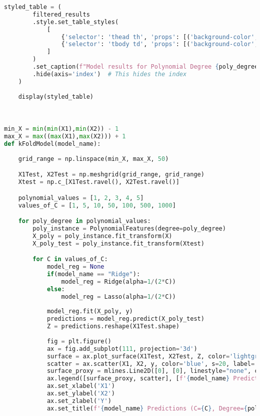\documentclass[a4paper,10pt]{article}
\begin{document}
\begin{enumerate}
\begin{lstlisting}[language=Python, caption={}]
    styled_table = (
        filtered_results
        .style.set_table_styles(
            [
                {'selector': 'thead th', 'props': [('background-color', 'white'), ('color', 'black'), ('font-size', '12pt')]},
                {'selector': 'tbody td', 'props': [('background-color', 'white'), ('color', 'black'), ('border', '1px solid black')]},
            ]
        )
        .set_caption(f"Model results for Polynomial Degree {poly_degree}")
        .hide(axis='index')  # This hides the index
    )
    
    display(styled_table)



min_X = min(min(X1),min(X2)) - 1
max_X = max((max(X1),max(X2))) + 1
def kFoldModel(model_name):
    
    grid_range = np.linspace(min_X, max_X, 50)

    X1Test, X2Test = np.meshgrid(grid_range, grid_range)
    Xtest = np.c_[X1Test.ravel(), X2Test.ravel()]

    polynomial_values = [1, 2, 3, 4, 5]
    values_of_C = [1, 5, 10, 50, 100, 500, 1000]

    for poly_degree in polynomial_values: 
        poly_instance = PolynomialFeatures(degree=poly_degree)
        X_poly = poly_instance.fit_transform(X)
        X_poly_test = poly_instance.fit_transform(Xtest)

        for C in values_of_C:
            model_reg = None
            if(model_name == "Ridge"):
                model_reg = Ridge(alpha=1/(2*C))
            else:
                model_reg = Lasso(alpha=1/(2*C))
                
            model_reg.fit(X_poly, y)
            predictions = model_reg.predict(X_poly_test)
            Z = predictions.reshape(X1Test.shape)
        
            fig = plt.figure()
            ax = fig.add_subplot(111, projection='3d')
            surface = ax.plot_surface(X1Test, X2Test, Z, color='lightgreen', alpha=0.6, rstride=1, cstride=1)
            scatter = ax.scatter(X1, X2, y, color='blue', s=20, label='Original Data')
            surface_proxy = mlines.Line2D([0], [0], linestyle="none", color='lightgreen', marker='s', markersize=10)
            ax.legend([surface_proxy, scatter], [f'{model_name} Predictions', 'Original Data'], numpoints=1, loc='upper left')
            ax.set_xlabel('X1')
            ax.set_ylabel('X2')
            ax.set_zlabel('Y')
            ax.set_title(f'{model_name} Predictions (C={C}, Degree={poly_degree})')


\end{lstlisting}
\end{enumerate}
\end{document}
